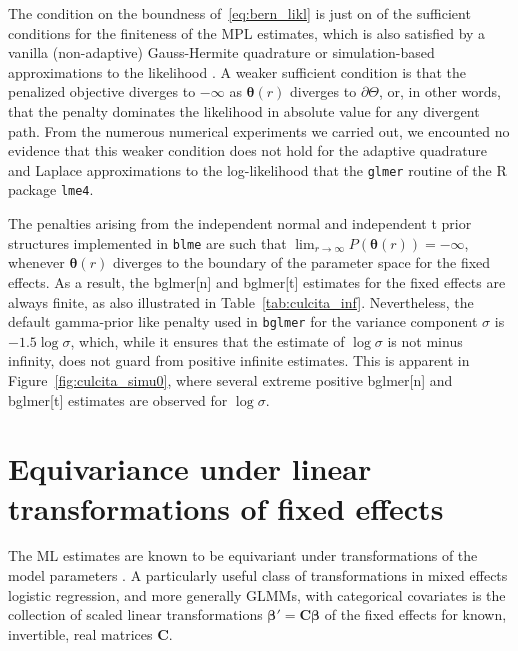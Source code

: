 \documentclass[11pt, a4paper]{article}
\newcommand*{\bb}{\boldsymbol}
\newcommand{\IK}[1]{{\noindent \color{blue} \bf \#IK: #1}}
\newcommand{\PS}[1]{{\noindent \color{red} \bf \#PS: #1}}
\theoremstyle{example} \newtheorem{example}{Example}[section]
\theoremstyle{theorem} \newtheorem{theorem}{Theorem}[section]
\def\bbeta{\bb{\beta}}
\def\btheta{\bb{\theta}}
\def\bC{\bb{C}}
\begin{document}
The condition on the boundness of~\eqref{eq:bern_likl} is just on of
the sufficient conditions for the finiteness of the MPL estimates,
which is also satisfied by a vanilla (non-adaptive) Gauss-Hermite
quadrature or simulation-based approximations to the likelihood
\citep[see, for example,][]{mcculloch:1997}. A weaker sufficient
condition is that the penalized objective diverges to $-\infty$ as
$\btheta(r)$ diverges to $\partial \Theta$, or, in other words, that
the penalty dominates the likelihood in absolute value for any
divergent path. From the numerous numerical experiments we carried
out, we encounted no evidence that this weaker condition does not hold
for the adaptive quadrature and Laplace approximations to the
log-likelihood that the \texttt{glmer} routine of the R package
\texttt{lme4}.

The penalties arising from the independent normal and independent t
prior structures implemented in \texttt{blme} are such that
$\lim_{r \to \infty} P(\btheta(r)) = -\infty$, whenever $\btheta(r)$
diverges to the boundary of the parameter space for the fixed
effects. As a result, the bglmer[n] and bglmer[t] estimates for the
fixed effects are always finite, as also illustrated in
Table~\ref{tab:culcita_inf}. Nevertheless, the default gamma-prior
like penalty used in \texttt{bglmer} for the variance component
$\sigma$ is $-1.5 \log\sigma$, which, while it ensures that the
estimate of $\log \sigma$ is not minus infinity, does not guard from
positive infinite estimates. This is apparent in
Figure~\ref{fig:culcita_simu0}, where several extreme positive
bglmer[n] and bglmer[t] estimates are observed for $\log\sigma$.

\section{Equivariance under linear transformations of fixed effects}\label{sec:invariance}
The ML estimates are known to be equivariant under transformations of
the model parameters \citep[see, for example][]{zehna:1966}.  A
particularly useful class of transformations in mixed effects logistic
regression, and more generally GLMMs, with categorical covariates is
the collection of scaled linear transformations $\bbeta' = \bC \bbeta$
of the fixed effects for known, invertible, real matrices $\bC$.
\end{document}
